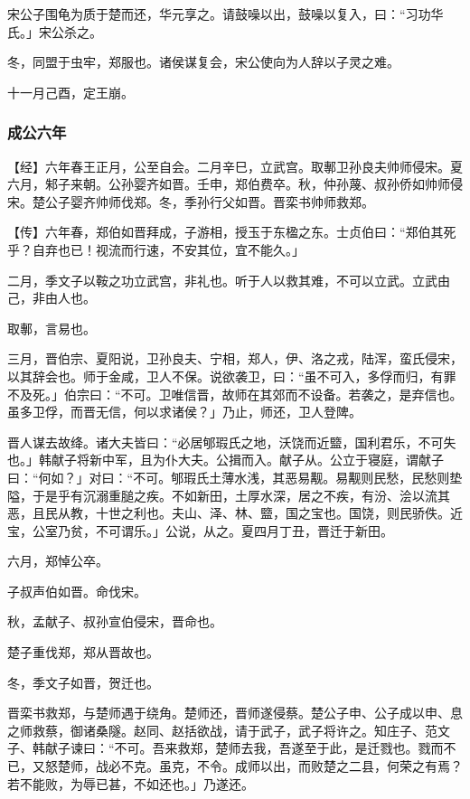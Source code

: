\documentclass[]{article}
\begin{document}
宋公子围龟为质于楚而还，华元享之。请鼓噪以出，鼓噪以复入，曰：``习功华氏。」宋公杀之。

冬，同盟于虫牢，郑服也。诸侯谋复会，宋公使向为人辞以子灵之难。

十一月己酉，定王崩。

\hypertarget{header-n1596}{%
\subsubsection{成公六年}\label{header-n1596}}

【经】六年春王正月，公至自会。二月辛巳，立武宫。取鄟卫孙良夫帅师侵宋。夏六月，邾子来朝。公孙婴齐如晋。壬申，郑伯费卒。秋，仲孙蔑、叔孙侨如帅师侵宋。楚公子婴齐帅师伐郑。冬，季孙行父如晋。晋栾书帅师救郑。

【传】六年春，郑伯如晋拜成，子游相，授玉于东楹之东。士贞伯曰：``郑伯其死乎？自弃也已！视流而行速，不安其位，宜不能久。」

二月，季文子以鞍之功立武宫，非礼也。听于人以救其难，不可以立武。立武由己，非由人也。

取鄟，言易也。

三月，晋伯宗、夏阳说，卫孙良夫、宁相，郑人，伊、洛之戎，陆浑，蛮氏侵宋，以其辞会也。师于金咸，卫人不保。说欲袭卫，曰：``虽不可入，多俘而归，有罪不及死。」伯宗曰：``不可。卫唯信晋，故师在其郊而不设备。若袭之，是弃信也。虽多卫俘，而晋无信，何以求诸侯？」乃止，师还，卫人登陴。

晋人谋去故绛。诸大夫皆曰：``必居郇瑕氏之地，沃饶而近盬，国利君乐，不可失也。」韩献子将新中军，且为仆大夫。公揖而入。献子从。公立于寝庭，谓献子曰：``何如？」对曰：``不可。郇瑕氏土薄水浅，其恶易觏。易觏则民愁，民愁则垫隘，于是乎有沉溺重膇之疾。不如新田，土厚水深，居之不疾，有汾、浍以流其恶，且民从教，十世之利也。夫山、泽、林、盬，国之宝也。国饶，则民骄佚。近宝，公室乃贫，不可谓乐。」公说，从之。夏四月丁丑，晋迁于新田。

六月，郑悼公卒。

子叔声伯如晋。命伐宋。

秋，孟献子、叔孙宣伯侵宋，晋命也。

楚子重伐郑，郑从晋故也。

冬，季文子如晋，贺迁也。

晋栾书救郑，与楚师遇于绕角。楚师还，晋师遂侵蔡。楚公子申、公子成以申、息之师救蔡，御诸桑隧。赵同、赵括欲战，请于武子，武子将许之。知庄子、范文子、韩献子谏曰：``不可。吾来救郑，楚师去我，吾遂至于此，是迁戮也。戮而不已，又怒楚师，战必不克。虽克，不令。成师以出，而败楚之二县，何荣之有焉？若不能败，为辱已甚，不如还也。」乃遂还。
\end{document}
